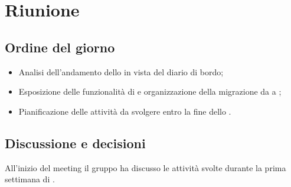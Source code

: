 \section{Riunione}
\subsection{Ordine del giorno}
\begin{itemize}
	\item Analisi dell'andamento dello  in vista del diario di bordo;
	\item Esposizione delle funzionalità di  e organizzazione della migrazione da  a ;
	\item Pianificazione delle attività da svolgere entro la fine dello .
\end{itemize}

\subsection{Discussione e decisioni}
\par All'inizio del meeting il gruppo ha discusso le attività svolte durante la prima settimana di .

